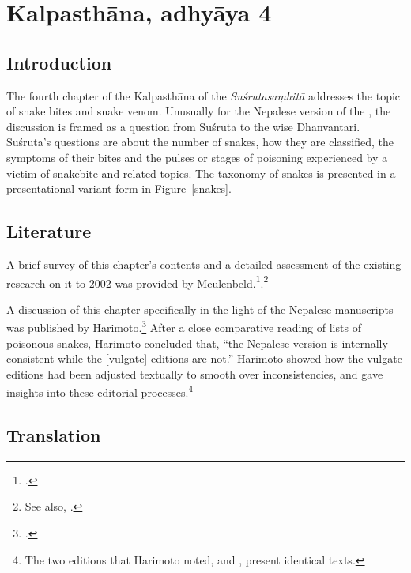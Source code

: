 \section{Kalpasthāna, adhyāya 4}

\subsection{Introduction}
The fourth chapter of the Kalpasthāna of the \emph{Suśrutasaṃhitā} addresses 
the topic of snake bites and snake venom.  Unusually for the Nepalese version of 
the \SS, the discussion is framed as a question from Suśruta to the wise 
Dhanvantari.  Suśruta's questions are about the number of snakes, how they 
are classified, the symptoms of their bites and the pulses or stages of poisoning 
experienced by a victim of snakebite and related topics.  The taxonomy of snakes 
is presented in a presentational variant form in Figure~\ref{snakes}.


    
\subsection{Literature}
A brief survey of this chapter's contents and a detailed assessment of the
existing research on it to 2002 was provided by Meulenbeld.\footcite[IA,
292--294]{meul-hist}.\footnote{See also, \cites{doni-2015,ewar-1878}.}
    
A discussion of this chapter specifically in the light of the Nepalese
manuscripts was published by Harimoto.\footcite[101--104]{hari-2011} After a
close comparative reading of lists of poisonous snakes, Harimoto concluded
that, “the Nepalese version is internally consistent while the [vulgate]
editions are not.”  Harimoto showed how the vulgate editions had been
adjusted textually to smooth over inconsistencies, and gave insights into
these editorial processes.\footnote{The two editions that Harimoto noted,
    \cite{vulgate} and \cite{bhat-1889}, present identical texts.}


\subsection{Translation}

